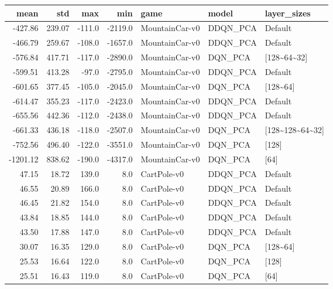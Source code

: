 \begin{tabular}{rrrrlll}
\toprule
    mean &     std &    max &     min &            game &     model &         layer\_sizes \\
\midrule
 -427.86 &  239.07 & -111.0 & -2119.0 &  MountainCar-v0 &  DDQN\_PCA &             Default \\
 -466.79 &  259.67 & -108.0 & -1657.0 &  MountainCar-v0 &  DDQN\_PCA &             Default \\
 -576.84 &  417.71 & -117.0 & -2890.0 &  MountainCar-v0 &   DQN\_PCA &       [128\textasciitilde 64\textasciitilde 32] \\
 -599.51 &  413.28 &  -97.0 & -2795.0 &  MountainCar-v0 &  DDQN\_PCA &             Default \\
 -601.65 &  377.45 & -105.0 & -2045.0 &  MountainCar-v0 &   DQN\_PCA &           [128\textasciitilde 64] \\
 -614.47 &  355.23 & -117.0 & -2423.0 &  MountainCar-v0 &  DDQN\_PCA &             Default \\
 -655.56 &  442.36 & -112.0 & -2438.0 &  MountainCar-v0 &  DDQN\_PCA &             Default \\
 -661.33 &  436.18 & -118.0 & -2507.0 &  MountainCar-v0 &   DQN\_PCA &  [128\textasciitilde 128\textasciitilde 64\textasciitilde 32] \\
 -752.56 &  496.40 & -122.0 & -3551.0 &  MountainCar-v0 &   DQN\_PCA &               [128] \\
-1201.12 &  838.62 & -190.0 & -4317.0 &  MountainCar-v0 &   DQN\_PCA &                [64] \\
   47.15 &   18.72 &  139.0 &     8.0 &     CartPole-v0 &  DDQN\_PCA &             Default \\
   46.55 &   20.89 &  166.0 &     8.0 &     CartPole-v0 &  DDQN\_PCA &             Default \\
   46.45 &   21.82 &  154.0 &     8.0 &     CartPole-v0 &  DDQN\_PCA &             Default \\
   43.84 &   18.85 &  144.0 &     8.0 &     CartPole-v0 &  DDQN\_PCA &             Default \\
   43.50 &   17.88 &  147.0 &     8.0 &     CartPole-v0 &  DDQN\_PCA &             Default \\
   30.07 &   16.35 &  129.0 &     8.0 &     CartPole-v0 &   DQN\_PCA &           [128\textasciitilde 64] \\
   25.53 &   16.64 &  122.0 &     8.0 &     CartPole-v0 &   DQN\_PCA &               [128] \\
   25.51 &   16.43 &  119.0 &     8.0 &     CartPole-v0 &   DQN\_PCA &                [64] \\

\end{tabular}
